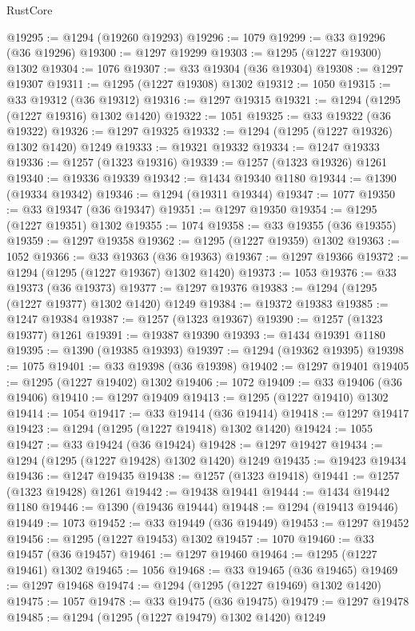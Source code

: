 \begin{lexlean}{RustCore}
\begin{coremodule}
@19295 := @1294 (@19260 @19293)
@19296 := 1079
@19299 := @33 @19296 (@36 @19296)
@19300 := @1297 @19299
@19303 := @1295 (@1227 @19300) @1302
@19304 := 1076
@19307 := @33 @19304 (@36 @19304)
@19308 := @1297 @19307
@19311 := @1295 (@1227 @19308) @1302
@19312 := 1050
@19315 := @33 @19312 (@36 @19312)
@19316 := @1297 @19315
@19321 := @1294 (@1295 (@1227 @19316) @1302 @1420)
@19322 := 1051
@19325 := @33 @19322 (@36 @19322)
@19326 := @1297 @19325
@19332 := @1294 (@1295 (@1227 @19326) @1302 @1420) @1249
@19333 := @19321 @19332
@19334 := @1247 @19333
@19336 := @1257 (@1323 @19316)
@19339 := @1257 (@1323 @19326) @1261
@19340 := @19336 @19339
@19342 := @1434 @19340 @1180
@19344 := @1390 (@19334 @19342)
@19346 := @1294 (@19311 @19344)
@19347 := 1077
@19350 := @33 @19347 (@36 @19347)
@19351 := @1297 @19350
@19354 := @1295 (@1227 @19351) @1302
@19355 := 1074
@19358 := @33 @19355 (@36 @19355)
@19359 := @1297 @19358
@19362 := @1295 (@1227 @19359) @1302
@19363 := 1052
@19366 := @33 @19363 (@36 @19363)
@19367 := @1297 @19366
@19372 := @1294 (@1295 (@1227 @19367) @1302 @1420)
@19373 := 1053
@19376 := @33 @19373 (@36 @19373)
@19377 := @1297 @19376
@19383 := @1294 (@1295 (@1227 @19377) @1302 @1420) @1249
@19384 := @19372 @19383
@19385 := @1247 @19384
@19387 := @1257 (@1323 @19367)
@19390 := @1257 (@1323 @19377) @1261
@19391 := @19387 @19390
@19393 := @1434 @19391 @1180
@19395 := @1390 (@19385 @19393)
@19397 := @1294 (@19362 @19395)
@19398 := 1075
@19401 := @33 @19398 (@36 @19398)
@19402 := @1297 @19401
@19405 := @1295 (@1227 @19402) @1302
@19406 := 1072
@19409 := @33 @19406 (@36 @19406)
@19410 := @1297 @19409
@19413 := @1295 (@1227 @19410) @1302
@19414 := 1054
@19417 := @33 @19414 (@36 @19414)
@19418 := @1297 @19417
@19423 := @1294 (@1295 (@1227 @19418) @1302 @1420)
@19424 := 1055
@19427 := @33 @19424 (@36 @19424)
@19428 := @1297 @19427
@19434 := @1294 (@1295 (@1227 @19428) @1302 @1420) @1249
@19435 := @19423 @19434
@19436 := @1247 @19435
@19438 := @1257 (@1323 @19418)
@19441 := @1257 (@1323 @19428) @1261
@19442 := @19438 @19441
@19444 := @1434 @19442 @1180
@19446 := @1390 (@19436 @19444)
@19448 := @1294 (@19413 @19446)
@19449 := 1073
@19452 := @33 @19449 (@36 @19449)
@19453 := @1297 @19452
@19456 := @1295 (@1227 @19453) @1302
@19457 := 1070
@19460 := @33 @19457 (@36 @19457)
@19461 := @1297 @19460
@19464 := @1295 (@1227 @19461) @1302
@19465 := 1056
@19468 := @33 @19465 (@36 @19465)
@19469 := @1297 @19468
@19474 := @1294 (@1295 (@1227 @19469) @1302 @1420)
@19475 := 1057
@19478 := @33 @19475 (@36 @19475)
@19479 := @1297 @19478
@19485 := @1294 (@1295 (@1227 @19479) @1302 @1420) @1249

\end{coremodule}
\end{lexlean}
